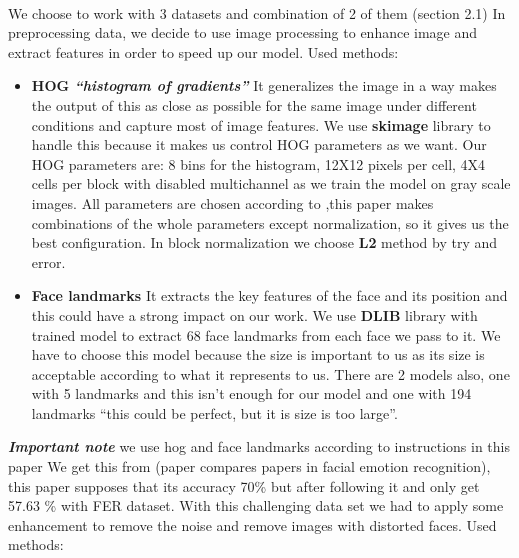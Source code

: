 \paragraph{}
We choose to work with 3 datasets and combination of 2 of them (section 2.1) \newline
In preprocessing data, we decide to use image processing to enhance image and extract features in order to speed up our model. \newline
Used methods: \newline
\begin{itemize}
\item \textbf{HOG \textit{“histogram of gradients”} }
\newline It generalizes the image in a way makes the output of this as close as possible for the same image under different conditions and capture most of image features. 
\newline We use \textbf{skimage} library to handle this because it makes us control HOG parameters as we want. 
\newline Our HOG parameters are: 8 bins for the histogram, 12X12 pixels per cell, 4X4 cells per block with disabled multichannel as we train the model on gray scale images. 
\newline All parameters are chosen according to \cite{hog},this paper makes combinations of the whole parameters except normalization, so it gives us the best configuration.
\newline
In block normalization we choose \textbf{L2} method by try and error.
\item \textbf{Face landmarks }
\newline It extracts the key features of the face and its position and this could have a strong impact on our work. 
\newline We use \textbf{DLIB} library with trained model to extract 68 face landmarks from each face we pass to it. 
\newline We have to choose this model because the size is important to us as its size is acceptable according to what it represents to us. 
\newline There are 2 models also, one with 5 landmarks and this isn’t enough for our model and one with 194 landmarks “this could be perfect, but it is size is too large”.
\end{itemize}
\textbf{\textit{Important note }} we use hog and face landmarks according to instructions in this paper \cite{method_5}  \newline
We get this from \cite{state_of_art} (paper compares papers in facial emotion recognition), this paper supposes that its accuracy 70\% but after following it and only get 57.63 \% with FER dataset. \newline
With this challenging data set we had to apply some enhancement to remove the noise and remove images with distorted faces. \newline
Used methods: \newline

